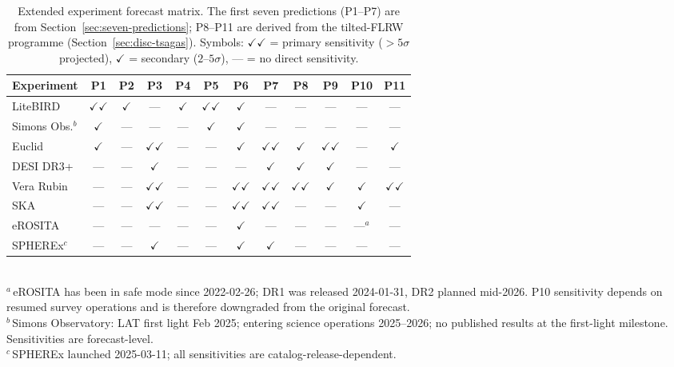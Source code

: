 \begin{table}[t]
\centering
\footnotesize
\setlength{\tabcolsep}{3pt}
\caption{Extended experiment forecast matrix.  The first seven
predictions (P1--P7) are from
Section~\ref{sec:seven-predictions}; P8--P11 are derived from
the tilted-FLRW programme
(Section~\ref{sec:disc-tsagas}).
Symbols: $\checkmark\checkmark$ = primary sensitivity
($> 5\sigma$ projected), $\checkmark$ = secondary
($2$--$5\sigma$), --- = no direct sensitivity.}
\label{tab:forecast-expanded}
\begin{tabular}{lccccccccccc}
\toprule
Experiment &
  P1 & P2 & P3 & P4 & P5 & P6 & P7 &
  P8 & P9 & P10 & P11 \\
\midrule
LiteBIRD &
  $\checkmark\checkmark$ & $\checkmark$ &
  --- & $\checkmark$ & $\checkmark\checkmark$ &
  $\checkmark$ & --- &
  --- & --- & --- & --- \\
Simons Obs.$^{b}$ &
  $\checkmark$ & --- &
  --- & --- & $\checkmark$ &
  $\checkmark$ & --- &
  --- & --- & --- & --- \\
Euclid &
  $\checkmark$ & --- &
  $\checkmark\checkmark$ & --- & --- &
  $\checkmark$ & $\checkmark\checkmark$ &
  $\checkmark$ & $\checkmark\checkmark$ &
  --- & $\checkmark$ \\
DESI DR3+ &
  --- & --- &
  $\checkmark$ & --- & --- &
  --- & $\checkmark$ &
  $\checkmark$ & $\checkmark$ &
  --- & --- \\
Vera Rubin &
  --- & --- &
  $\checkmark\checkmark$ & --- & --- &
  $\checkmark\checkmark$ & $\checkmark\checkmark$ &
  $\checkmark\checkmark$ & $\checkmark$ &
  $\checkmark$ & $\checkmark\checkmark$ \\
SKA &
  --- & --- &
  $\checkmark\checkmark$ & --- & --- &
  $\checkmark\checkmark$ & $\checkmark\checkmark$ &
  --- & --- &
  $\checkmark$ & --- \\
eROSITA &
  --- & --- &
  --- & --- & --- &
  $\checkmark$ & --- &
  --- & --- &
  ---$^{a}$ & --- \\
SPHEREx$^{c}$ &
  --- & --- &
  $\checkmark$ & --- & --- &
  $\checkmark$ & $\checkmark$ &
  --- & --- & --- & --- \\
\bottomrule
\end{tabular}
\\[4pt]
{\footnotesize $^{a}$\,eROSITA has been in safe mode since
2022-02-26; DR1 was released 2024-01-31, DR2 planned mid-2026.
P10 sensitivity depends on resumed survey operations and is
therefore downgraded from the original forecast.\\
$^{b}$\,Simons Observatory: LAT first light Feb 2025;
entering science operations 2025--2026; no published results
at the first-light milestone. Sensitivities are forecast-level.\\
$^{c}$\,SPHEREx launched 2025-03-11; all sensitivities are
catalog-release-dependent.}
\end{table}

